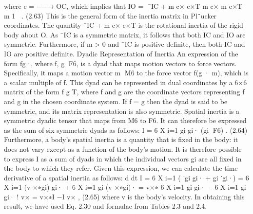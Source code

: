 where c = −−→ OC, which implies that IO = ¯IC + m c× c×T m c× m c×T m 1  . (2.63) This is the general form of the inertia matrix in Pl¨ucker coordinates. The quantity ¯IC + m c× c×T is the rotational inertia of the rigid body about O. As ¯IC is a symmetric matrix, it follows that both IC and IO are symmetric. Furthermore, if m > 0 and ¯IC is positive definite, then both IC and IO are positive definite. Dyadic Representation of Inertia An expression of the form fg·, where f, g ∈F6, is a dyad that maps motion vectors to force vectors. Specifically, it maps a motion vector m ∈M6 to the force vector f(g · m), which is a scalar multiple of f. This dyad can be represented in dual coordinates by a 6×6 matrix of the form f g T, where f and g are the coordinate vectors representing f and g in the chosen coordinate system. If f = g then the dyad is said to be symmetric, and its matrix representation is also symmetric. Spatial inertia is a symmetric dyadic tensor that maps from M6 to F6. It can therefore be expressed as the sum of six symmetric dyads as follows: I = 6 X i=1 gi gi· (gi ∈F6) . (2.64) Furthermore, a body’s spatial inertia is a quantity that is fixed in the body: it does not vary except as a function of the body’s motion. It is therefore possible to express I as a sum of dyads in which the individual vectors gi are all fixed in the body to which they refer. Given this expression, we can calculate the time derivative of a spatial inertia as follows: d dt I = 6 X i=1 ( ˙gi gi· + gi ˙gi·) = 6 X i=1 (v ×∗gi) gi· + 6 X i=1 gi (v ×∗gi)· = v×∗ 6 X i=1 gi gi· − 6 X i=1 gi gi· ! v× = v×∗I −I v× , (2.65) where v is the body’s velocity. In obtaining this result, we have used Eq. 2.30 and formulae from Tables 2.3 and 2.4.

